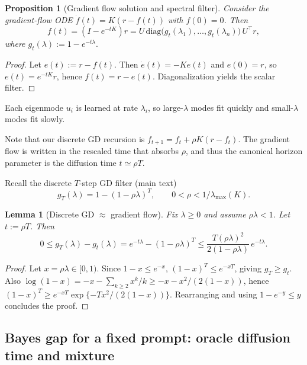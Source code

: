 \documentclass{article}
\theoremstyle{plain}
\newtheorem{proposition}[theorem]{Proposition}
\newtheorem{lemma}[theorem]{Lemma}
\theoremstyle{definition}
\theoremstyle{remark}
\begin{document}
\begin{proposition}[Gradient flow solution and spectral filter]\label{prop:app_gf_solution_short}
Consider the gradient-flow ODE $\dot f(t)=K(r-f(t))$ with $f(0)=0$.
Then
\begin{equation}
    f(t)=(I-e^{-tK})r
    = U\,\mathrm{diag}\!\bigl(g_t(\lambda_1),\dots,g_t(\lambda_n)\bigr)\,U^\top r,
\label{eq:app_gf_filter_short}
\end{equation}
where $g_t(\lambda):=1-e^{-t\lambda}.$
\end{proposition}

\begin{proof}
Let $e(t):=r-f(t)$. Then $\dot e(t)=-Ke(t)$ and $e(0)=r$, so $e(t)=e^{-tK}r$, hence $f(t)=r-e(t)$.
Diagonalization yields the scalar filter.
\end{proof}

Each eigenmode $u_i$ is learned at rate $\lambda_i$, so large-$\lambda$ modes fit quickly and small-$\lambda$ modes fit slowly.

Note that our discrete GD recursion is $f_{t+1}=f_t+\rho K(r-f_t)$.
The gradient flow is written in the rescaled time that absorbs $\rho$, and thus the canonical horizon parameter is the diffusion time $t\simeq \rho T$.

Recall the discrete $T$-step GD filter (main text)
\[
    g_T(\lambda)=1-(1-\rho\lambda)^T,\qquad 0<\rho<1/\lambda_{\max}(K).
\]
\begin{lemma}[Discrete GD $\approx$ gradient flow]\label{lem:app_gd_to_gf_short}
Fix $\lambda\ge 0$ and assume $\rho\lambda<1$. Let $t:=\rho T$. Then
\begin{equation}
    0\le g_T(\lambda)-g_t(\lambda)=e^{-t\lambda}-(1-\rho\lambda)^T
    \le \frac{T(\rho\lambda)^2}{2(1-\rho\lambda)}\,e^{-t\lambda}.
\end{equation}
\end{lemma}

\begin{proof}
Let $x=\rho\lambda\in[0,1)$. Since $1-x\le e^{-x}$, $(1-x)^T\le e^{-xT}$, giving $g_T\ge g_t$. Also $\log(1-x)=-x-\sum_{k\ge 2}x^k/k\ge -x-x^2/(2(1-x))$, hence $(1-x)^T\ge e^{-xT}\exp\{-Tx^2/(2(1-x))\}$. Rearranging and using $1-e^{-y}\le y$ concludes the proof.
\end{proof}

\subsection{Bayes gap for a fixed prompt: oracle diffusion time and mixture}
\end{document}
